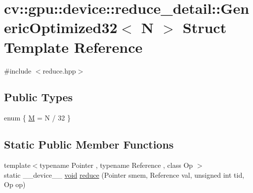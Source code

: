 \hypertarget{structcv_1_1gpu_1_1device_1_1reduce__detail_1_1GenericOptimized32}{\section{cv\-:\-:gpu\-:\-:device\-:\-:reduce\-\_\-detail\-:\-:Generic\-Optimized32$<$ N $>$ Struct Template Reference}
\label{structcv_1_1gpu_1_1device_1_1reduce__detail_1_1GenericOptimized32}
}


{\ttfamily \#include $<$reduce.\-hpp$>$}

\subsection*{Public Types}
\begin{DoxyCompactItemize}
\item 
enum \{ \hyperlink{structcv_1_1gpu_1_1device_1_1reduce__detail_1_1GenericOptimized32_ac9408140985cf02e615ebdd2d253ba87ac798bbe5212878ee4110d97cad1cf710}{M} = N / 32
 \}
\end{DoxyCompactItemize}
\subsection*{Static Public Member Functions}
\begin{DoxyCompactItemize}
\item 
{\footnotesize template$<$typename Pointer , typename Reference , class Op $>$ }\\static \-\_\-\-\_\-device\-\_\-\-\_\- \hyperlink{legacy_8hpp_a8bb47f092d473522721002c86c13b94e}{void} \hyperlink{structcv_1_1gpu_1_1device_1_1reduce__detail_1_1GenericOptimized32_a8296b8051da411ba92d067dd3d714775}{reduce} (Pointer smem, Reference val, unsigned int tid, Op op)
\end{DoxyCompactItemize}



